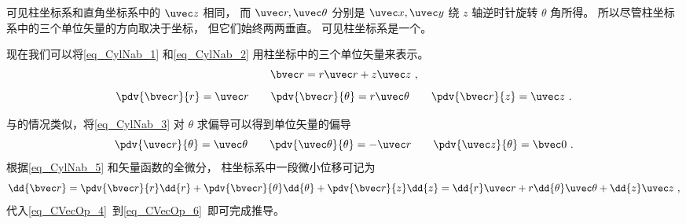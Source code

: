 可见柱坐标系和直角坐标系中的 $\uvec z$ 相同， 而 $\uvec r, \uvec \theta$ 分别是 $\uvec x, \uvec y$ 绕 $z$ 轴逆时针旋转 $\theta$ 角所得。 所以尽管柱坐标系中的三个单位矢量的方向取决于坐标， 但它们始终两两垂直。 可见柱坐标系是一个。

现在我们可以将\autoref{eq_CylNab_1} 和\autoref{eq_CylNab_2} 用柱坐标中的三个单位矢量来表示。
\begin{equation}
\bvec r = r\uvec r + z\uvec z~,
\end{equation}
\begin{equation}\label{eq_CylNab_5}
\pdv{\bvec r}{r} = \uvec r \qquad \pdv{\bvec r}{\theta} = r\uvec \theta \qquad \pdv{\bvec r}{z} = \uvec z~.
\end{equation}

与的情况类似，将\autoref{eq_CylNab_3} 对 $\theta$ 求偏导可以得到单位矢量的偏导
\begin{equation}
\pdv{\uvec r}{\theta} = \uvec \theta \qquad
\pdv{\uvec \theta}{\theta} = -\uvec r \qquad
\pdv{\uvec z}{\theta} = \bvec 0~.
\end{equation}
根据\autoref{eq_CylNab_5} 和矢量函数的全微分，%
柱坐标系中一段微小位移可记为
\begin{equation}\label{eq_CylNab_7}
\dd{\bvec r} = \pdv{\bvec r}{r}\dd{r} + \pdv{\bvec r}{\theta}\dd{\theta} + \pdv{\bvec r}{z}\dd{z} = \dd{r}\uvec r + r\dd{\theta} \uvec \theta + \dd{z} \uvec z~,
\end{equation}
代入\autoref{eq_CVecOp_4}~到\autoref{eq_CVecOp_6}~即可完成推导。
